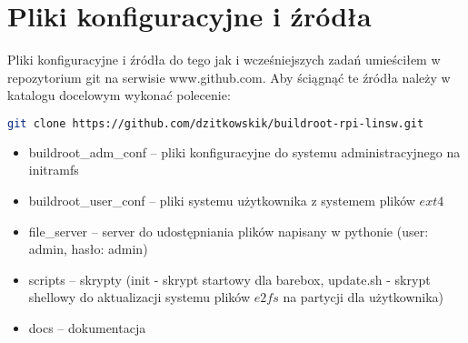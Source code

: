 \section{Pliki konfiguracyjne i źródła}
Pliki konfiguracyjne i źródła do tego jak i wcześniejszych zadań umieściłem w repozytorium
git na serwisie www.github.com. Aby ściągnąć te źródła należy w katalogu docelowym wykonać polecenie:
\begin{lstlisting}[language=bash]
git clone https://github.com/dzitkowskik/buildroot-rpi-linsw.git
\end{lstlisting}	
\begin{itemize}
\item buildroot\_adm\_conf -- pliki konfiguracyjne do systemu administracyjnego na initramfs
\item buildroot\_user\_conf -- pliki systemu użytkownika z systemem plików $ext4$
\item file\_server -- server do udostępniania plików napisany w pythonie (user: admin, hasło: admin)
\item scripts -- skrypty (init - skrypt startowy dla barebox, update.sh - skrypt shellowy do aktualizacji systemu plików $e2fs$ na partycji dla użytkownika)
\item docs -- dokumentacja
\end{itemize}

